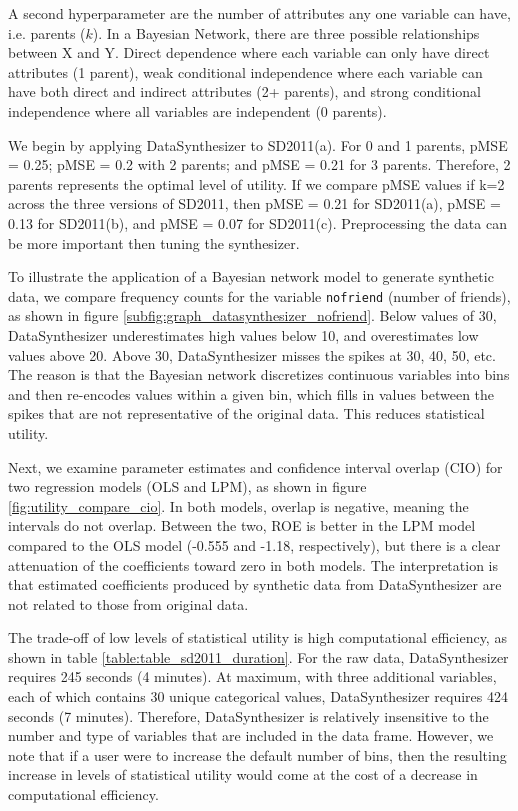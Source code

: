 \documentclass[runningheads]{llncs}
\begin{document}
A second hyperparameter are the number of attributes any one variable can have, i.e. parents ($k$).  In a Bayesian Network, there are three possible relationships between X and Y.  Direct dependence where each variable can only have direct attributes (1 parent), weak conditional independence where each variable can have both direct and indirect attributes (2+ parents), and strong conditional independence where all variables are independent (0 parents).  

We begin by applying DataSynthesizer to SD2011(a).  For 0 and 1 parents, pMSE = 0.25; pMSE = 0.2 with 2 parents; and pMSE = 0.21 for 3 parents.  Therefore, 2 parents represents the optimal level of utility.  If we compare pMSE values if k=2 across the three versions of SD2011, then  pMSE = 0.21 for SD2011(a), pMSE = 0.13 for SD2011(b), and pMSE = 0.07 for SD2011(c).  Preprocessing the data can be more important then tuning the synthesizer.  

To illustrate the application of a Bayesian network model to generate synthetic data, we compare frequency counts for the variable \texttt{nofriend} (number of friends), as shown in figure \ref{subfig:graph_datasynthesizer_nofriend}. Below values of 30, DataSynthesizer underestimates high values below 10, and overestimates low values above 20.  Above 30, DataSynthesizer misses the spikes at 30, 40, 50, etc.  The reason is that the Bayesian network discretizes continuous variables into bins and then re-encodes values within a given bin, which fills in values between the spikes that are not representative of the original data.  This reduces statistical utility.

Next, we examine parameter estimates and confidence interval overlap (CIO) for two regression models (OLS and LPM), as shown in figure \ref{fig:utility_compare_cio}.  In both models, overlap is negative, meaning the intervals do not overlap.  Between the two, ROE is better in the LPM model compared to the OLS model (-0.555 and -1.18, respectively), but there is a clear attenuation of the coefficients toward zero in both models.  The interpretation is that estimated coefficients produced by synthetic data from DataSynthesizer are not related to those from original data.

The trade-off of low levels of statistical utility is high computational efficiency, as shown in table \ref{table:table_sd2011_duration}.  For the raw data, DataSynthesizer requires 245 seconds (4 minutes).  At maximum, with three additional variables, each of which contains 30 unique categorical values, DataSynthesizer requires 424 seconds (7 minutes).  Therefore, DataSynthesizer is relatively insensitive to the number and type of variables that are included in the data frame.  However, we note that if a user were to increase the default number of bins, then the resulting increase in levels of statistical utility would come at the cost of a decrease in computational efficiency.
\end{document}
